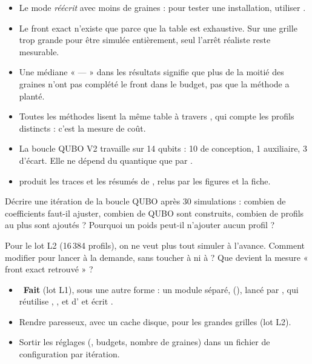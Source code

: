 \begin{piege}
\begin{itemize}
\item Le mode  \emph{réécrit}  avec moins de graines : pour tester une installation, utiliser .
\item Le front exact n'existe que parce que la table est exhaustive. Sur une grille trop grande pour être simulée entièrement, seul l'arrêt réaliste reste mesurable.
\item Une médiane « --- » dans les résultats signifie que plus de la moitié des graines n'ont pas complété le front dans le budget, pas que la méthode a planté.
\end{itemize}
\end{piege}

\begin{resultat}
\begin{itemize}
\item Toutes les méthodes lisent la même table à travers , qui compte les profils distincts : c'est la mesure de coût.
\item La boucle QUBO V2 travaille sur 14 qubits : 10 de conception, 1 auxiliaire, 3 d'écart. Elle ne dépend du quantique que par .
\item {} produit les traces et les résumés de , relus par les figures et la fiche.
\end{itemize}
\end{resultat}

\exercices
\begin{exercice}
Décrire une itération de la boucle QUBO après 30 simulations : combien de coefficients faut-il ajuster, combien de QUBO sont construits, combien de profils au plus sont ajoutés ? Pourquoi un poids peut-il n'ajouter aucun profil ?
\end{exercice}

\begin{exercice}
Pour le lot L2 (16\,384 profils), on ne veut plus tout simuler à l'avance. Comment modifier  pour lancer  à la demande, sans toucher à  ni à  ? Que devient la mesure « front exact retrouvé » ?
\end{exercice}

\begin{pistes}
\begin{itemize}
\item {}~\textbf{Fait} (lot L1), sous une autre forme : un module séparé,  (), lancé par , qui réutilise , ,  et  d' et écrit .
\item Rendre  paresseux, avec un cache disque, pour les grandes grilles (lot L2).
\item Sortir les réglages (, budgets, nombre de graines) dans un fichier de configuration par itération.
\end{itemize}
\end{pistes}
